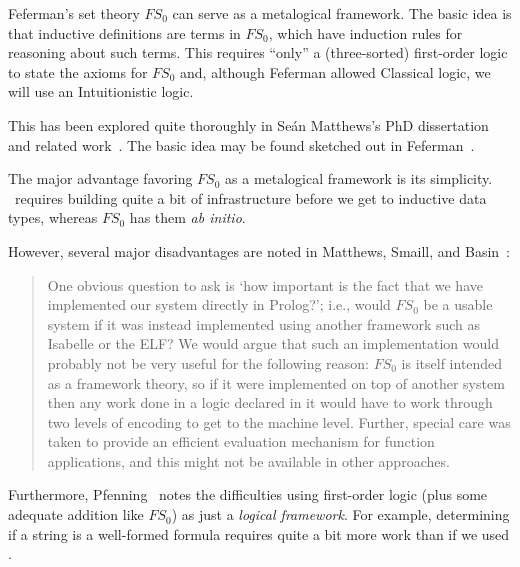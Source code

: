 \begin{node}
Feferman's set theory $FS_{0}$ can serve as a metalogical framework.
The basic idea is that inductive definitions are terms in $FS_{0}$,
which have induction rules for reasoning about such terms. This
requires ``only'' a (three-sorted) first-order logic to state the
axioms for $FS_{0}$ and, although Feferman allowed Classical logic, we
will use an Intuitionistic logic.

This has been explored quite thoroughly in Se\'{a}n Matthews's PhD
dissertation~\cite{matthews1992metatheoretic} and related work~\cite{matthews1992experience,matthews1993theory}.
The basic idea may be found sketched out in Feferman~\cite[\S21]{feferman1989finitary}.

The major advantage favoring $FS_{0}$ as a metalogical framework is
its simplicity. \HOL\ requires building quite a bit of infrastructure
before we get to inductive data types, whereas $FS_{0}$ has them
\textit{ab initio}.

However, several major disadvantages are noted in Matthews, Smaill,
and Basin~\cite[\S5.1]{matthews1992experience}:
\begin{quote}
One obvious question to ask is `how important is the fact that we have 
implemented our system directly in Prolog?'; i.e., would $FS_{0}$ be a usable 
system if it was instead implemented using another framework such as
Isabelle or the ELF? We would argue that such an implementation would 
probably not be very useful for the following reason: $FS_{0}$ is itself intended 
as a framework theory, so if it were implemented on top of another system 
then any work done in a logic declared in it would have to work through 
two levels of encoding to get to the machine level. Further, special care was 
taken to provide an efficient evaluation mechanism for function applications, 
and this might not be available in other approaches. 
\end{quote}
Furthermore, Pfenning~\cite{pfenning2001logical} notes the
difficulties using first-order logic (plus some adequate addition like 
$FS_{0}$) as just a \emph{logical framework}. For example, determining
if a string is a well-formed formula requires quite a bit more work
than if we used \HOL.
\end{node}

